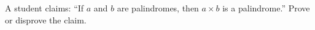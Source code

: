 A student claims: ``If $a$ and $b$ are palindromes, then $a\times b$ is a palindrome.'' Prove or disprove the claim.
